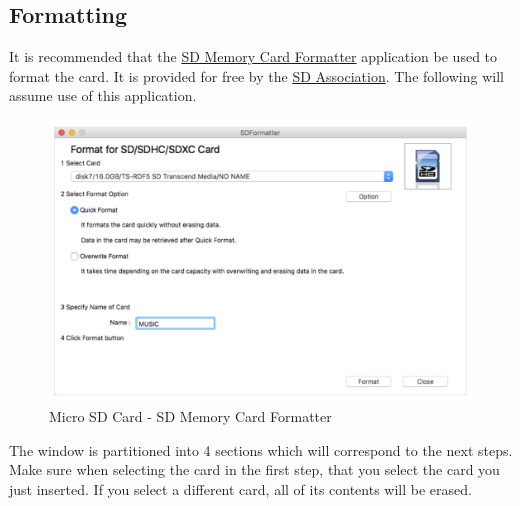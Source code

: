 \subsection{Formatting}

It is recommended that the
\href{https://www.sdcard.org/downloads/formatter\_4/}{SD Memory Card Formatter}
application be used to format the card.  It is provided for free by the
\href{https://www.sdcard.org/index.html}{SD Association}.  The following will
assume use of this application.


\begin{figure}[H]
\centering
  \includegraphics{images/sd_formatter.png}
\caption{Micro SD Card - SD Memory Card Formatter}
\end{figure}

The window is partitioned into \num{4} sections which will correspond to the
next steps.  Make sure when selecting the card in the first step, that you
select the card you just inserted.  If you select a different card, all of
its contents will be erased.

